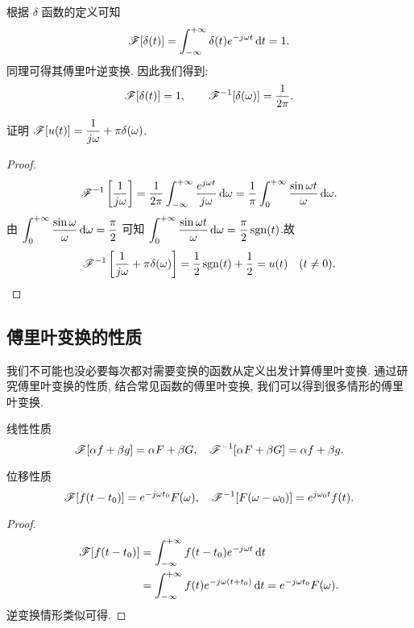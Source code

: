 根据 $\delta$ 函数的定义可知
\[\mathscr{F}[\delta(t)]=\int_{-\infty}^{+\infty}\delta(t)e^{-j\omega t}\,\mathrm{d} t=1.\]
同理可得其傅里叶逆变换.
因此我们得到:
	\[\mathscr{F}[\delta(t)]=1,\qquad
	\mathscr{F}^{-1}[\delta(\omega)]=\dfrac1{2\pi}.\]

\begin{example}
	证明 \emph{$\mathscr{F}[u(t)]=\dfrac1{j\omega}+\pi\delta(\omega)$}.
\end{example}

\begin{proof}
		\[\mathscr{F}^{-1}\left[\frac1{j\omega}\right]
		=\frac1{2\pi}\int_{-\infty}^{+\infty}\frac{e^{j\omega t}}{j\omega} \,\mathrm{d}\omega
		=\frac1\pi\int_0^{+\infty}\frac{\sin\omega t}{\omega} \,\mathrm{d}\omega.\]
	{由
		$\displaystyle\int_0^{+\infty}\frac{\sin\omega}\omega \,\mathrm{d}\omega=\dfrac\pi2$
		可知
		$\displaystyle\int_0^{+\infty}\frac{\sin\omega t}\omega \,\mathrm{d}\omega=\frac\pi2\operatorname{sgn}(t)$.故
		\[\mathscr{F}^{-1} \left[\frac1{j\omega}+\pi\delta(\omega)\right]
		=\frac{1}{2}\operatorname{sgn}(t)+\frac{1}{2} =u(t)\quad (t\neq 0).\qedhere\]
	}
\end{proof}

\subsection{傅里叶变换的性质}

我们不可能也没必要每次都对需要变换的函数从定义出发计算傅里叶变换.
通过研究傅里叶变换的性质, 结合常见函数的傅里叶变换, 我们可以得到很多情形的傅里叶变换.

\begin{theorem}{线性性质}
	\[\mathscr{F}[\alpha f+\beta g]=\alpha F+\beta G,\quad
	\mathscr{F}^{-1}[\alpha F+\beta G]=\alpha f+\beta g.\]
\end{theorem}

\begin{theorem}{位移性质}
	\[\mathscr{F}[f(t-t_0)]=e^{-j\omega t_0}F(\omega),\quad
	\mathscr{F}^{-1}[F(\omega-\omega_0)]=e^{j\omega_0 t}f(t).\]
\end{theorem}

\begin{proof}
	\begin{align*}
		\mathscr{F}[f(t-t_0)]&=\int_{-\infty}^{+\infty}f(t-t_0)e^{-j\omega t}\,\mathrm{d} t\\
		&=\int_{-\infty}^{+\infty}f(t)e^{-j\omega (t+t_0)}\,\mathrm{d} t=e^{-j\omega t_0}F(\omega).
	\end{align*}
	{逆变换情形类似可得.\qedhere}
\end{proof}

